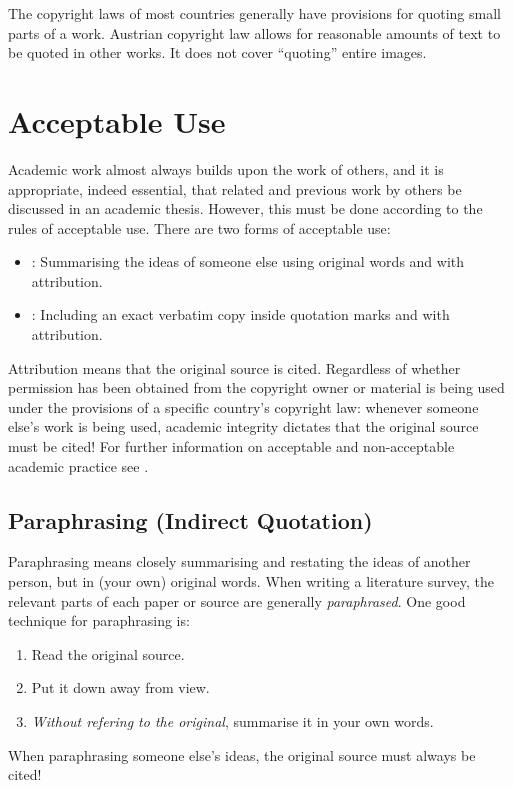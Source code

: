 The copyright laws of most countries generally have provisions for
quoting small parts of a work. Austrian copyright law \parencite[§
  42f]{UrhG} allows for reasonable amounts of text to be quoted in
other works. It does not cover ``quoting'' entire images.




\section{Acceptable Use}

Academic work almost always builds upon the work of others, and it is
appropriate, indeed essential, that related and previous work by
others be discussed in an academic thesis. However, this must be done
according to the rules of acceptable use. There are two forms of
acceptable use:
\begin{itemize}
\item {}: Summarising the ideas
  of someone else using original words and with attribution.
\item {}: Including an exact
  verbatim copy inside quotation marks and with attribution.
\end{itemize}
Attribution means that the original source is cited.
Regardless of whether permission has been obtained from the copyright
owner or material is being used under the provisions of a specific
country's copyright law: whenever someone else's work is being used,
academic integrity dictates that the original source must be cited!
%
For further information on acceptable and non-acceptable academic
practice see \parencite{FremdeFedern,Wikipedia-Zitat}.




\subsection{Paraphrasing (Indirect Quotation)}

Paraphrasing means closely summarising and restating the ideas of
another person, but in (your own) original words. When writing a
literature survey, the relevant parts of each paper or source are
generally \emph{paraphrased}. One good technique for paraphrasing is:
\begin{enumerate}
\item Read the original source.
\item Put it down away from view.
\item \emph{Without refering to the original}, summarise it in your own words.
\end{enumerate}
When paraphrasing someone else's ideas, the original source must
always be cited!


